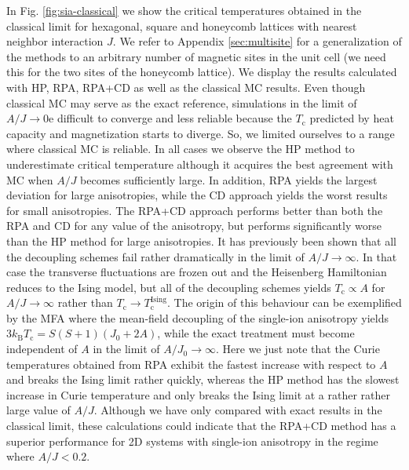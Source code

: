 \documentclass[aps,prb,reprint,floatfix,superscriptaddress]{revtex4-2}
\begin{document}
In Fig. \ref{fig:sia-classical} we show the critical temperatures obtained in the classical limit for hexagonal, square and honeycomb lattices with nearest neighbor interaction $J$. We refer to Appendix \ref{sec:multisite} for a generalization of the methods to an arbitrary number of magnetic sites in the unit cell (we need this for the two sites of the honeycomb lattice). We display the results calculated with HP, RPA, RPA+CD as well as the classical MC results.
Even though classical MC may serve as the exact reference, simulations in the limit of $A/J \rightarrow 0$e difficult to converge and less reliable because the $T_\mathrm{c}$ predicted by heat capacity and magnetization starts to diverge. So, we limited ourselves to a range where classical MC is reliable. In all cases we observe the HP method to underestimate critical temperature although it acquires the best agreement with MC when $A/J$ becomes sufficiently large. In addition, RPA yields the largest deviation for large anisotropies, while the CD approach yields the worst results for small anisotropies. The RPA+CD approach performs better than both the RPA and CD for any value of the anisotropy, but performs significantly worse than the HP method for large anisotropies. It has previously been shown that all the decoupling schemes fail rather dramatically in the limit of $A/J\rightarrow\infty$. In that case the transverse fluctuations are frozen out and the Heisenberg Hamiltonian reduces to the Ising
model, but all of the decoupling schemes yields $T_\mathrm{c}\propto A$ for $A/J\rightarrow\infty$ \cite{Torelli_2019,FROBRICH2006223} rather than $T_\mathrm{c}\rightarrow T_\mathrm{c}^\mathrm{Ising}$. The origin of this behaviour can be exemplified by the MFA where the mean-field decoupling of the single-ion anisotropy yields $3k_\mathrm{B}T_\mathrm{c}=S(S+1)(J_0+2A)$, while the exact treatment must become independent of $A$ in the limit of $A/J_0\rightarrow\infty$. Here we just note that the Curie temperatures obtained from RPA exhibit the fastest increase with respect to $A$ and breaks the Ising limit rather quickly, whereas the HP method has the slowest increase in Curie temperature and only breaks the Ising limit at a rather rather large value of $A/J$. Although we have only compared with exact results in the classical limit, these calculations could indicate that the RPA+CD method has a superior performance for 2D systems with single-ion anisotropy in the regime where $A/J < 0.2$.
\end{document}
